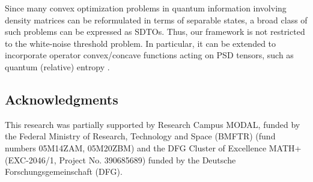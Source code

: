 \documentclass[smallextended]{svjour3}
\newcommand{\1}{\mathbf{1}}
\begin{document}
Since many convex optimization problems in quantum information involving density matrices can be reformulated in terms of separable states, a broad class of such problems can be expressed as SDTOs. Thus, our framework is not restricted to the white-noise threshold problem. In particular, it can be extended to incorporate operator convex/concave functions acting on PSD tensors, such as quantum (relative) entropy \cite{hiai2014introduction}.

\subsection*{Acknowledgments}
This research was partially supported by Research Campus MODAL,
funded by the Federal Ministry of Research, Technology and Space (BMFTR)
(fund numbers 05M14ZAM, 05M20ZBM) and the DFG
Cluster of Excellence MATH+ (EXC-2046/1, Project No. 390685689) funded
by the Deutsche Forschungsgemeinschaft (DFG).

{

}
{

}

\end{document}
